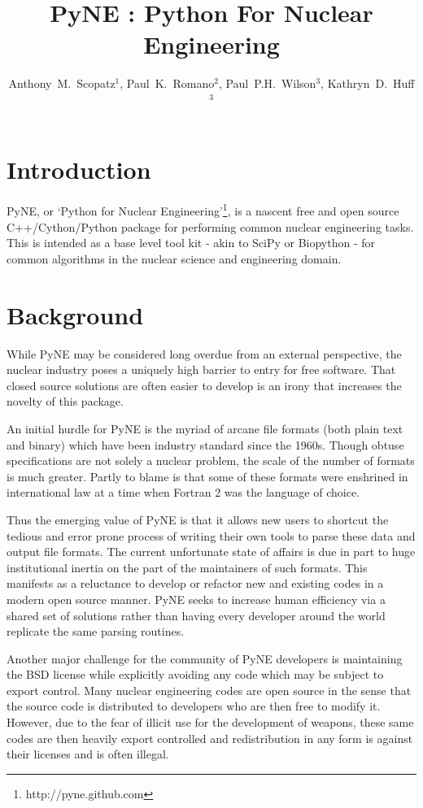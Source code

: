 \documentclass{anstrans}
\title{PyNE : Python For Nuclear Engineering}
\author{Anthony~M.~Scopatz$^1$, Paul~K.~Romano$^2$, Paul~P.H.~Wilson$^3$, Kathryn~D.~Huff$^3$}
\institute{$^1$ University of Chicago, $^2$ Massachusetts Institute of Technology, $^3$ University of Wisconsin }
\date{}
\begin{document}
\section{Introduction}

PyNE, or `Python for Nuclear Engineering'\footnote{http://pyne.github.com}, is a
nascent free and open source C++/Cython/Python package for performing common
nuclear engineering tasks.  This is intended as a base level tool kit - akin to
SciPy or Biopython - for common algorithms in the nuclear science and
engineering domain.

\section{Background}

While PyNE may be considered long overdue from an external perspective, the 
nuclear industry poses a uniquely high barrier to entry for free software.  
That closed source solutions are often easier to develop is an irony that 
increases the novelty of this package.

An initial hurdle for PyNE is the myriad of arcane file formats (both plain text
and binary) which have been industry standard since the 1960s.  Though obtuse
specifications are not solely a nuclear problem, the scale of the number of
formats is much greater.  Partly to blame is that some of these formats were
enshrined in international law at a time when Fortran 2 was the language of
choice.

Thus the emerging value of PyNE is that it allows new users to shortcut the
tedious and error prone process of writing their own tools to parse these data
and output file formats.  The current unfortunate state of affairs is due in
part to huge institutional inertia on the part of the maintainers of such
formats.  This manifests as a reluctance to develop or refactor new and existing
codes in a modern open source manner.  PyNE seeks to increase human efficiency
via a shared set of solutions rather than having every developer around the
world replicate the same parsing routines.

Another major challenge for the community of PyNE developers is maintaining the
BSD license while explicitly avoiding any code which may be subject to export
control.  Many nuclear engineering codes are open source in the sense that the
source code is distributed to developers who are then free to modify it.
However, due to the fear of illicit use for the development of weapons, these
same codes are then heavily export controlled and redistribution in any form is
against their licenses and is often illegal.
\end{document}
